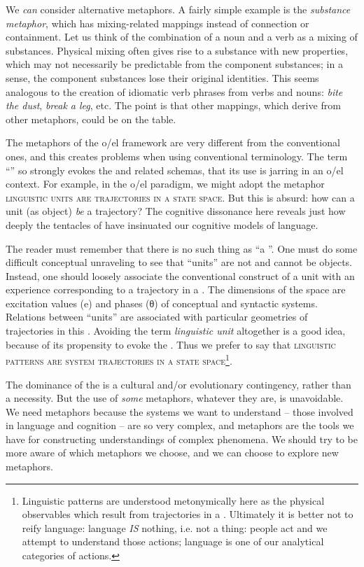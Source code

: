   We \textit{can} consider alternative metaphors. A fairly simple example is the \textit{substance metaphor}, which has mixing-related mappings instead of connection or containment. Let us think of the combination of a noun and a verb as a mixing of substances. Physical mixing often gives rise to a substance with new properties, which may not necessarily be predictable from the component substances; in a sense, the component substances lose their original identities. This seems analogous to the creation of idiomatic verb phrases from verbs and nouns: \textit{bite the dust}, \textit{break a leg}, etc. The point is that other mappings, which derive from other metaphors, could be on the table.

  The metaphors of the o/el framework are very different from the conventional ones, and this creates problems when using conventional terminology. The term “” so strongly evokes the  and related schemas, that its use is jarring in an o/el context. For example, in the o/el paradigm, we might adopt the metaphor \textsc{linguistic units are trajectories in a state space}. But this is absurd: how can a unit (as object) \textit{be} a trajectory? The cognitive dissonance here reveals just how deeply the tentacles of  have insinuated our cognitive models of language.

  The reader must remember that there is no such thing as “a ”. One must do some difficult conceptual unraveling to see that “units” are not and cannot be objects. Instead, one should loosely associate the conventional construct of a unit with an experience corresponding to a trajectory in a . The dimensions of the space are excitation values (e) and phases (θ) of conceptual and syntactic systems. Relations between “units” are associated with particular geometries of trajectories in this . Avoiding the term \textit{linguistic unit} altogether is a good idea, because of its propensity to evoke the . Thus we prefer to say that \textsc{linguistic patterns are system trajectories in a state space}\footnote{Linguistic patterns are understood metonymically here as the physical observables which result from trajectories in a . Ultimately it is better not to reify language: language \textit{IS} nothing, i.e. not a thing: people act and we attempt to understand those actions; language is one of our analytical categories of actions.}.

  The dominance of the  is a cultural and/or evolutionary contingency, rather than a necessity. But the use of \textit{some} metaphors, whatever they are, is unavoidable. We need metaphors because the systems we want to understand -- those involved in language and cognition -- are so very complex, and metaphors are the tools we have for constructing understandings of complex phenomena. We should try to be more aware of which metaphors we choose, and we can choose to explore new metaphors.

